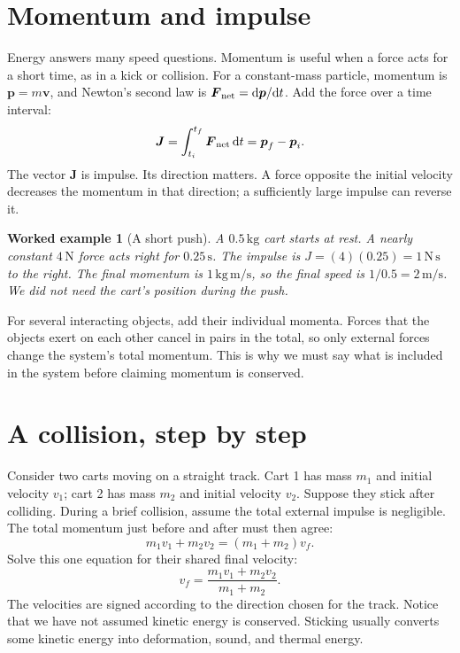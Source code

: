 \documentclass[11pt,oneside]{book}
\newcommand{\dd}{\mathrm{d}}
\newcommand{\vect}[1]{\boldsymbol{#1}}
\theoremstyle{reviewstyle}
\newtheorem{example}{Worked example}[chapter]
\begin{document}
\section{Momentum and impulse}
Energy answers many speed questions. Momentum is useful when a force acts for a short time, as in a kick or collision. For a constant-mass particle, momentum is $\vect p=m\vect v$, and Newton's second law is $\vect F_{\rm net}=\dd\vect p/\dd t$. Add the force over a time interval:
\begin{equation}
\vect J=\int_{t_i}^{t_f}\vect F_{\rm net}\,\dd t
=\vect p_f-\vect p_i.
\label{eq:impulse}
\end{equation}
The vector $\vect J$ is impulse. Its direction matters. A force opposite the initial velocity decreases the momentum in that direction; a sufficiently large impulse can reverse it.

\begin{example}[A short push]
A $0.5\,\mathrm{kg}$ cart starts at rest. A nearly constant $4\,\mathrm N$ force acts right for $0.25\,\mathrm s$. The impulse is $J=(4)(0.25)=1\,\mathrm{N\,s}$ to the right. The final momentum is $1\,\mathrm{kg\,m/s}$, so the final speed is $1/0.5=2\,\mathrm{m/s}$. We did not need the cart's position during the push.
\end{example}

For several interacting objects, add their individual momenta. Forces that the objects exert on each other cancel in pairs in the total, so only external forces change the system's total momentum. This is why we must say what is included in the system before claiming momentum is conserved.

\section{A collision, step by step}
Consider two carts moving on a straight track. Cart 1 has mass $m_1$ and initial velocity $v_1$; cart 2 has mass $m_2$ and initial velocity $v_2$. Suppose they stick after colliding. During a brief collision, assume the total external impulse is negligible. The total momentum just before and after must then agree:
\begin{equation}
m_1v_1+m_2v_2=(m_1+m_2)v_f.
\end{equation}
Solve this one equation for their shared final velocity:
\begin{equation}
v_f=\frac{m_1v_1+m_2v_2}{m_1+m_2}.
\label{eq:sticking-collision}
\end{equation}
The velocities are signed according to the direction chosen for the track. Notice that we have not assumed kinetic energy is conserved. Sticking usually converts some kinetic energy into deformation, sound, and thermal energy.
\end{document}
